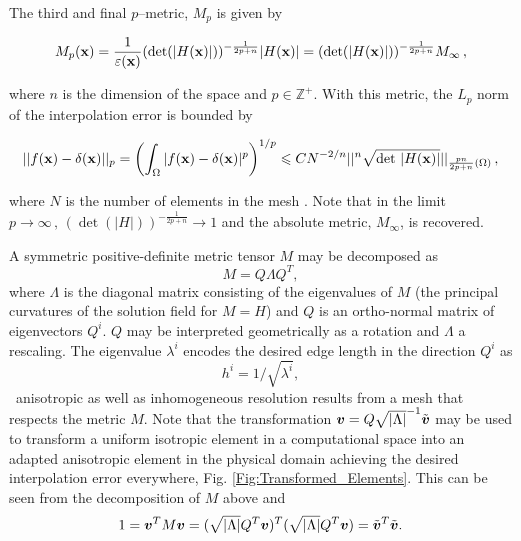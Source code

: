 The third and final $p$--metric, $M_p$ is given by \citep{chen2007optimal}

\begin{equation}\label{eq:metric_l2}
M_p({\bf x}) = \frac{1}{\epsilon({\bf x})}(\det(|H({\bf
x})|))^{-\frac{1}{2p+n}}|H({\bf x})| = (\det(|H({\bf
x})|))^{-\frac{1}{2p+n}}M_\infty \, ,
\end{equation}

where $n$ is the dimension of the space and $p \in \mathbb{Z}^+$. With
this metric, the $L_p$ norm of the interpolation error is bounded by

\begin{equation}
||f({\bf x})-\delta({\bf x})||_p = \left( \int_\Omega |f({\bf
x})-\delta({\bf x})|^{p} \right) ^{1/p} \leq CN^{-2/n}||^n \sqrt{\det
\, |H({\bf x})|}||_{\frac{pn}{2p+n}(\Omega)} \, ,
\end{equation}

where $N$ is the number of elements in the mesh
\citep{adaptivity_loseille_10-ii}. Note that in the limit \mbox{$p \to
  \infty\, , \, (\det(|H|))^{-\frac{1}{2p+n}} \to 1$} and the absolute
metric, $M_\infty$, is recovered.

A symmetric positive-definite metric tensor $M$ may be decomposed as
\begin{equation*}
M = Q \Lambda Q^T,
\end{equation*}
where $\Lambda$ is the diagonal matrix consisting of the eigenvalues
of $M$ (the principal curvatures of the solution field for $M=H$) and
$Q$ is an ortho-normal matrix of eigenvectors ${Q}^i$. $Q$ may be
interpreted geometrically as a rotation and $\Lambda$ a rescaling.
The eigenvalue $\lambda^i$ encodes the desired edge length in the
direction ${Q}^i$ as
\begin{equation*}
h^i = 1 / \sqrt{{\lambda}^i},
\end{equation*}
\ie\ anisotropic as well as inhomogeneous resolution results from a
mesh that respects the metric $M$. Note that the transformation
${\bmv}=Q\sqrt{|\Lambda|}^{-1}\tilde{\bmv}$ may be used to transform a
uniform isotropic element in a computational space into an adapted
anisotropic element in the physical domain achieving the desired
interpolation error everywhere,
Fig. \ref{Fig:Transformed_Elements}. This can be seen from the
decomposition of $M$ above and
\begin{equation*}
1={\bmv}^T  M {\bmv} = (\sqrt{|\Lambda|}Q^T\bmv)^T(\sqrt{|\Lambda|}Q^T\bmv)=\tilde{\bmv}^T\tilde{\bmv}.
\end{equation*}

